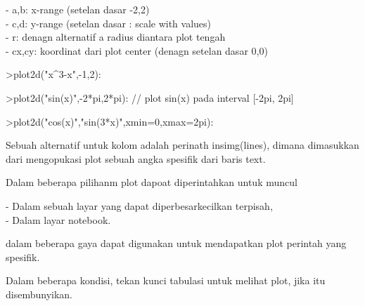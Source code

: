 \documentclass[a4paper,10pt]{article}
\begin{document}
\begin{eulernotebook}
\begin{eulercomment}
\begin{eulercomment}
\begin{eulercomment}
\begin{eulercomment}
\begin{eulercomment}
\begin{eulercomment}
\begin{eulercomment}
- a,b: x-range (setelan dasar -2,2)\\
- c,d: y-range (setelan dasar : scale with values)\\
- r: denagn alternatif a radius diantara plot tengah\\
- cx,cy: koordinat dari plot center (denagn setelan dasar  0,0)
\end{eulercomment}
\begin{eulerprompt}
>plot2d("x^3-x",-1,2):
\end{eulerprompt}
\begin{eulerprompt}
>plot2d("sin(x)",-2*pi,2*pi): // plot sin(x) pada interval [-2pi, 2pi]
\end{eulerprompt}
\begin{eulerprompt}
>plot2d("cos(x)","sin(3*x)",xmin=0,xmax=2pi):
\end{eulerprompt}
\begin{eulercomment}
Sebuah alternatif untuk kolom adalah perinath insimg(lines), dimana
dimasukkan dari mengopukasi plot sebuah angka spesifik dari baris
text. 

Dalam beberapa pilihanm plot dapoat diperintahkan untuk muncul

- Dalam sebuah layar yang dapat diperbesarkecilkan terpisah,\\
- Dalam layar notebook.

dalam beberapa gaya dapat digunakan untuk mendapatkan plot perintah
yang spesifik. 

Dalam beberapa kondisi, tekan kunci tabulasi untuk melihat plot, jika
itu disembunyikan. 


\end{eulercomment}
\end{eulercomment}
\end{eulercomment}
\end{eulercomment}
\end{eulercomment}
\end{eulercomment}
\end{eulercomment}
\end{eulernotebook}
\end{document}
